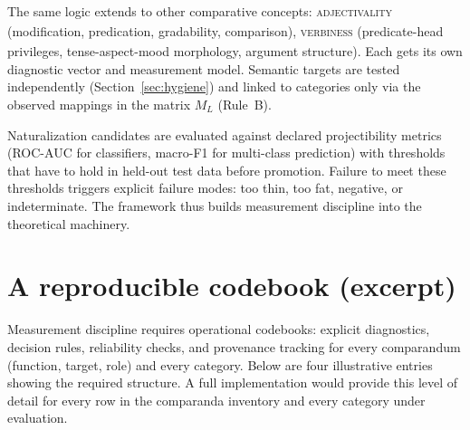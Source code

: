 \documentclass[12pt]{article}
\begin{document}
The same logic extends to other comparative concepts: \textsc{adjectivality}\textsubscript{\Cross} (modification, predication, gradability, comparison), \textsc{verbiness}\textsubscript{\Cross} (predicate-head privileges, tense-aspect-mood morphology, argument structure). Each gets its own diagnostic vector and measurement model. Semantic targets are tested independently (Section~\ref{sec:hygiene}) and linked to categories only via the observed mappings in the matrix $M_L$ (Rule~B).

Naturalization candidates are evaluated against declared projectibility metrics (ROC-AUC for classifiers, macro-F1 for multi-class prediction) with thresholds that have to  hold in held-out test data before promotion. Failure to meet these thresholds triggers explicit failure modes: too thin, too fat, negative, or indeterminate. The framework thus builds measurement discipline into the theoretical machinery.

\section{A reproducible codebook (excerpt)}\label{sec:codebook}
Measurement discipline requires operational codebooks: explicit diagnostics, decision rules, reliability checks, and provenance tracking for every comparandum (function, target, role) and every category. Below are four illustrative entries showing the required structure. A full implementation would provide this level of detail for every row in the comparanda inventory and every category under evaluation.
\end{document}
